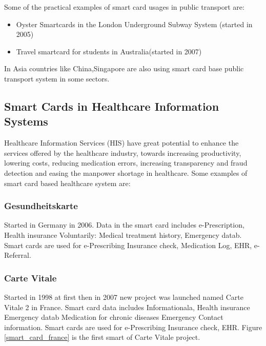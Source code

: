 \documentclass[12pt]{article}
\begin{document}
Some of the practical examples of smart card usages in public transport are:
\begin{itemize}
\item Oyster Smartcards in the London Underground Subway System (started in 2005)
\item Travel smartcard for students in Australia(started in 2007)

\end{itemize}
In Asia countries like China,Singapore are also using smart card base public transport system in some sectors.

\subsection{Smart Cards in Healthcare Information Systems}
Healthcare Information Services (HIS) have great
potential to enhance the services offered by the
healthcare industry, towards increasing productivity,
lowering costs, reducing medication errors, increasing
transparency and fraud detection and easing the manpower
shortage in healthcare.\cite{ref_2}
Some examples of smart card based healthcare system are:
\subsubsection{Gesundheitskarte}
Started in Germany in 2006. Data in the smart card includes e-Prescription,
Health insurance
Voluntarily:
Medical treatment
history, Emergency
datab. Smart cards are used for e-Prescribing
Insurance
check,
Medication
Log, EHR,
e-Referral.

\subsubsection{Carte Vitale}
Started in 1998 at first then in 2007 new project was launched named Carte Vitale 2 in France. Smart card data includes Informationala,
Health insurance
Emergency datab
Medication for
chronic diseases
Emergency Contact
information. Smart cards are used for e-Prescribing
Insurance
check,
EHR. Figure \ref{smart_card_france} is the first smart of Carte Vitale project.
\end{document}
